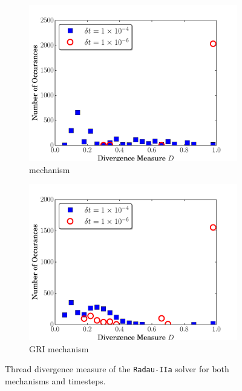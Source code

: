 \documentclass[preprint]{elsarticle}
\begin{document}
\begin{figure}[htb]
  \centering
  \begin{subfigure}{0.49\textwidth}
      \includegraphics[width=\linewidth]{H2_radau2a_div.pdf}
      \caption{ mechanism}
  \end{subfigure}
  \begin{subfigure}{0.49\textwidth}
      \includegraphics[width=\linewidth]{CH4_radau2a_div.pdf}
      \caption{GRI mechanism}
  \end{subfigure}
  \caption{Thread divergence measure of the \texttt{Radau-IIa} solver for both mechanisms and timesteps.}
  \label{F:divergence}
\end{figure}
\end{document}
